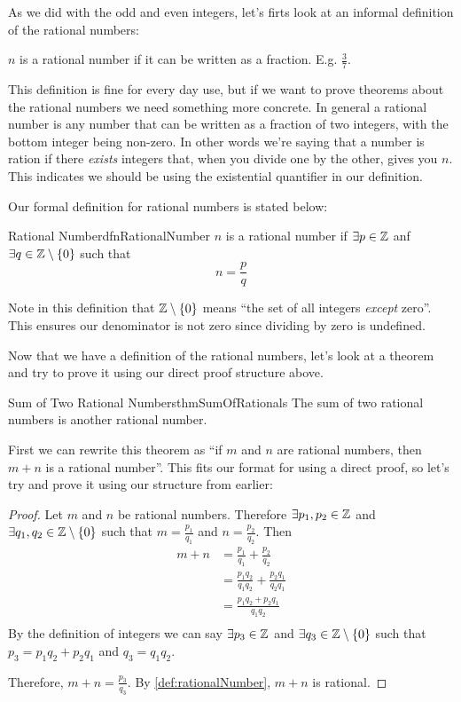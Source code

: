 As we did with the odd and even integers, let's firts look at an informal definition of the rational numbers:
\begin{center}
    $n$ is a rational number if it can be written as a fraction. E.g. $\frac{3}{7}$.
\end{center}

This definition is fine for every day use, but if we want to prove theorems about the rational numbers we need something more concrete. In general a rational number is any number that can be written as a fraction of two integers, with the bottom integer being non-zero. In other words we're saying that a number is ration if there \emph{exists} integers that, when you divide one by the other, gives you $n$. This indicates we should be using the existential quantifier in our definition.

Our formal definition for rational numbers is stated below:
\begin{dfn}[label={def:rationalNumber}]{Rational Number}{dfnRationalNumber}
    $n$ is a rational number if $\exists p \in \mathbb{Z}$ anf $\exists q \in \mathbb{Z}\setminus\{0\}$ such that
    $$ n = \frac{p}{q}$$
\end{dfn}
Note in this definition that $\mathbb{Z}\setminus\{0\}$ means ``the set of all integers \emph{except} zero''. This ensures our denominator is not zero since dividing by zero is undefined.

Now that we have a definition of the rational numbers, let's look at a theorem and try to prove it using our direct proof structure above.

\begin{theorem}[label={theorem:sumOfRationals}]{Sum of Two Rational Numbers}{thmSumOfRationals}
    The sum of two rational numbers is another rational number.
\end{theorem}

First we can rewrite this theorem as ``if $m$ and $n$ are rational numbers, then $m + n$ is a rational number''. This fits our format for using a direct proof, so let's try and prove it using our structure from earlier:

\begin{proof}
    Let $m$ and $n$ be rational numbers. Therefore $\exists p_1,p_2 \in \mathbb{Z}$ and $\exists q_1,q_2 \in \mathbb{Z} \setminus \{0\}$ such that $m = \frac{p_1}{q_1}$ and $n = \frac{p_2}{q_2}$.
    Then
    \begin{align*}
        m + n & = \frac{p_1}{q_1} + \frac{p_2}{q_2}                                           \\
              & = \frac{p_1q_2}{q_1q_2} + \frac{p_2q_1}{q_2q_1} \tag*{by cross-multipliation} \\
              & = \frac{p_1q_2 + p_2q_1}{q_1q_2}                                              \\
    \end{align*}
    By the definition of integers we can say $\exists p_3 \in \mathbb{Z}$ and $\exists q_3 \in \mathbb{Z} \setminus \{0\}$ such that $p_3 = p_1q_2 + p_2q_1$ and $q_3 = q_1q_2$.

    Therefore, $m + n  = \frac{p_3}{q_3}$. By \cref{def:rationalNumber}, $m + n$ is rational.
\end{proof}


